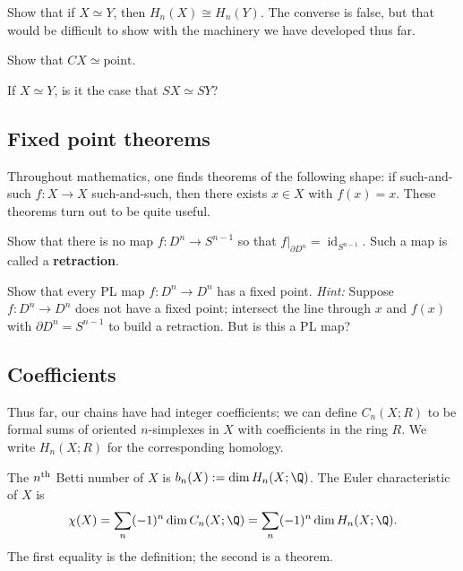 \documentclass[12pt]{pset}
\DeclareMathOperator{\id}{id}
\begin{document}
\begin{problem}
  Show that if $X \simeq Y$, then $H_n(X) \cong H_n(Y)$.  The converse
  is false, but that would be difficult to show with the machinery we
  have developed thus far.
\end{problem}

\begin{requiredproblem}
 Show that $CX \simeq \mbox{point}$.
\end{requiredproblem}

\begin{problem}
  If $X \simeq Y$, is it the case that $SX \simeq SY$?
\end{problem}


\subsection*{Fixed point theorems}

Throughout mathematics, one finds theorems of the following shape: if
such-and-such $f : X \to X$ such-and-such, then there exists $x \in X$
with $f(x) = x$.  These theorems turn out to be quite useful.

\begin{problem} Show that there is no map $f :
  D^n \to S^{n-1}$ so that $f |_{\partial D^n} =
    \id_{S^{n-1}}$.  Such a map is called a \textbf{retraction}.
\end{problem}

\begin{problem} Show that every PL map
  $f : D^n \to D^n$ has a fixed point.  \textit{Hint:} Suppose $f :
  D^n \to D^n$ does not have a fixed point; intersect the line through
  $x$ and $f(x)$ with $\partial D^n = S^{n-1}$ to build a retraction.
  But is this a PL map?
\end{problem}

\subsection*{Coefficients}

\begin{definition*}
  Thus far, our chains have had integer coefficients; we can define
  $C_n(X;R)$ to be formal sums of oriented $n$-simplexes in $X$ with
  coefficients in the ring $R$.  We write $H_n(X;R)$ for the
  corresponding homology.

  The $n^{\mbox{\scriptsize th}}$ Betti number of $X$ is $b_n(X) := \dim H_n(X;\Q)$.  The
  Euler characteristic of $X$ is
  $$
  \chi(X) = \sum_n (-1)^n \dim C_n(X;\Q) = \sum_n (-1)^n \dim H_n(X;\Q).
  $$
  The first equality is the definition; the second is a theorem.
\end{definition*}
\end{document}
